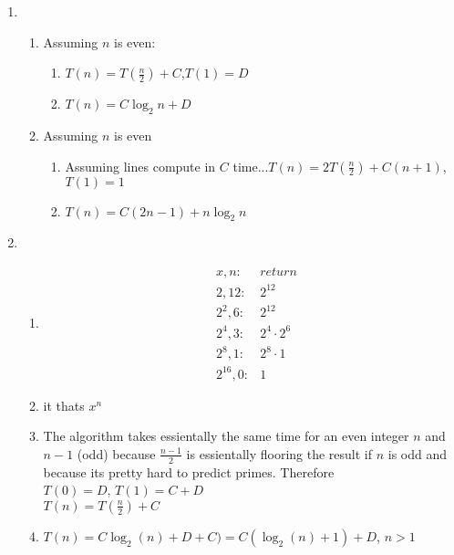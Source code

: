 \documentclass[12pt]{article}
\begin{document}
\begin{enumerate}
\begin{enumerate}
  \end{enumerate}
  \newpage
\item
  \begin{enumerate}
  \item Assuming $n$ is even:
    \begin{enumerate}
    \item $T(n)= T(\frac{n}{2})+C$,$T(1)=D$
    \item $T(n) = C\log_2n+D$
    \end{enumerate}
  \item Assuming $n$ is even
    \begin{enumerate}
    \item Assuming lines compute in $C$ time...$T(n)=2T(\frac{n}{2})+C(n+1)$, $T(1)=1$
    \item $T(n)=C(2n-1)+n\log_2n$
    \end{enumerate}
  \end{enumerate}
\item
  \begin{enumerate}
  \item
    \begin{align*}
    &x,    n  :&return\\    
    &2,    12 :&2^{12}\\
    &2^2,  6  :&2^{12}\\
    &2^4,  3  :&2^4\cdot 2^6\\
    &2^8,  1  :&2^8\cdot 1 \\
    &2^16, 0  :&1
  \end{align*}
\item it thats $x^n$
\item The algorithm takes essientally the same time for an even integer $n$ and
  $n-1$ (odd) because $\frac{n-1}{2}$ is essientally flooring the result if
  $n$ is odd and because its pretty hard to predict primes. Therefore\\
  $T(0)=D$, $T(1)=C+D$\\
  $T(n)=T(\frac{n}{2})+C$
\item $T(n)=C\log_2(n) + D + C) = C(\log_2(n)+1)+ D$, $n>1$

\end{enumerate}

\end{enumerate}
\end{document}
